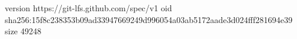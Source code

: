 version https://git-lfs.github.com/spec/v1
oid sha256:15f8c238353b09ad33947669249d996054a03ab5172aade3d024fff281694e39
size 49248
